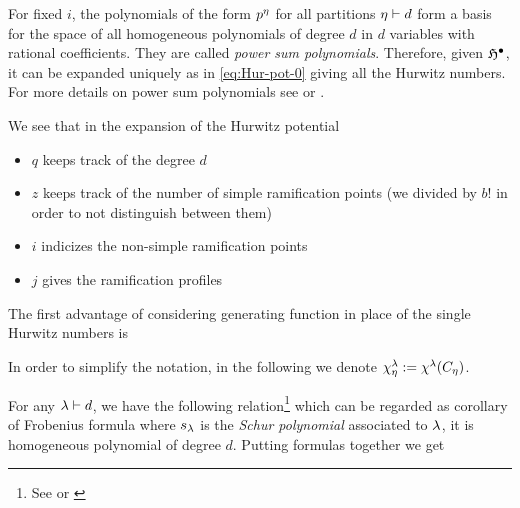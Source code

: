 \documentclass[../main/main.tex]{subfiles}
\begin{document}
For fixed $i$, the polynomials of the form $p^\eta$ for all partitions $\eta\vdash d$ form a basis for the space of all homogeneous polynomials of degree $d$ in $d$ variables with rational coefficients. They are called \emph{power sum polynomials}. Therefore, given $\mathfrak H^\bullet$, it can be expanded uniquely as in \eqref{eq:Hur-pot-0} giving all the Hurwitz numbers. For more details on power sum polynomials see \cite[§A]{FH} or \cite[Part I]{M}. 

We see that in the expansion of the Hurwitz potential
\begin{itemize}
	\item $q$ keeps track of the degree $d$
	\item $z$ keeps track of the number of simple ramification points (we divided by $b!$ in order to not distinguish between them)
	\item $i$ indicizes the non-simple ramification points
	\item $j$ gives the ramification profiles
\end{itemize}

The first advantage of considering generating function in place of the single Hurwitz numbers is 

\begin{theorem}[{\cite[Thm. 10.2.1]{CM}}]
\end{theorem}

In order to simplify the notation, in the following we denote $\chi^\lambda_\eta:=\chi^\lambda(C_\eta)$. 

For any $\lambda\vdash d$, we have the following relation\footnote{See \cite[§A, Prop. 4.37, Ex. A.29]{FH} or \cite[Part I]{M}} which can be regarded as corollary of Frobenius formula
where $s_\lambda$ is the \emph{Schur polynomial} associated to $\lambda$, it is homogeneous polynomial of degree $d$. Putting formulas together we get
\end{document}
